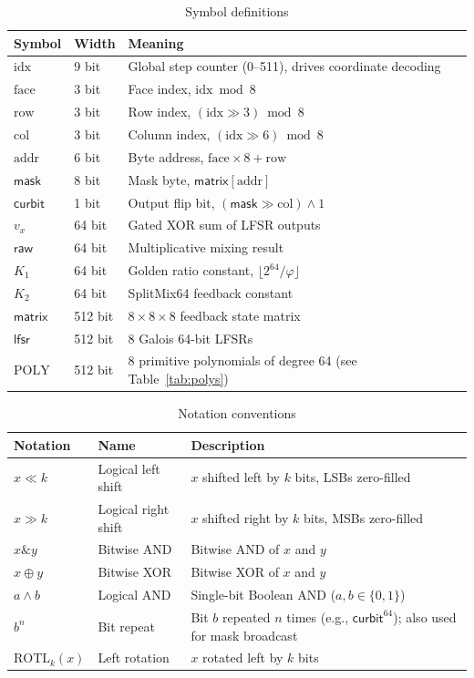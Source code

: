 \documentclass[11pt,a4paper]{article}
\begin{document}
\begin{table}[H]
\centering
\begin{tabular}{@{}llp{5cm}@{}}
\toprule
\textbf{Symbol} & \textbf{Width} & \textbf{Meaning} \\
\midrule
$\mathrm{idx}$   & 9 bit  & Global step counter (0--511), drives coordinate decoding \\
$\mathrm{face}$  & 3 bit  & Face index, $\mathrm{idx} \bmod 8$ \\
$\mathrm{row}$   & 3 bit  & Row index, $(\mathrm{idx} \gg 3) \bmod 8$ \\
$\mathrm{col}$   & 3 bit  & Column index, $(\mathrm{idx} \gg 6) \bmod 8$ \\
$\mathrm{addr}$  & 6 bit  & Byte address, $\mathrm{face} \times 8 + \mathrm{row}$ \\
$\mathsf{mask}$  & 8 bit  & Mask byte, $\mathsf{matrix}[\mathrm{addr}]$ \\
$\mathsf{curbit}$ & 1 bit & Output flip bit, $(\mathsf{mask} \gg \mathrm{col}) \land 1$ \\
$v_x$            & 64 bit & Gated XOR sum of LFSR outputs \\
$\mathsf{raw}$   & 64 bit & Multiplicative mixing result \\
$K_1$            & 64 bit & Golden ratio constant, $\lfloor 2^{64}/\varphi \rfloor$ \\
$K_2$            & 64 bit & SplitMix64 feedback constant \\
$\mathsf{matrix}$ & 512 bit & $8{\times}8{\times}8$ feedback state matrix \\
$\mathsf{lfsr}$  & 512 bit & 8 Galois 64-bit LFSRs \\
$\mathrm{POLY}$  & 512 bit & 8 primitive polynomials of degree 64 (see Table~\ref{tab:polys}) \\
\bottomrule
\end{tabular}
\caption{Symbol definitions}
\label{tab:symbols}
\end{table}

\begin{table}[H]
\centering
\begin{tabular}{@{}llp{5cm}@{}}
\toprule
\textbf{Notation} & \textbf{Name} & \textbf{Description} \\
\midrule
$x \ll k$   & Logical left shift  & $x$ shifted left by $k$ bits, LSBs zero-filled \\
$x \gg k$   & Logical right shift & $x$ shifted right by $k$ bits, MSBs zero-filled \\
$x \mathbin{\&} y$ & Bitwise AND  & Bitwise AND of $x$ and $y$ \\
$x \oplus y$ & Bitwise XOR & Bitwise XOR of $x$ and $y$ \\
$a \land b$ & Logical AND   & Single-bit Boolean AND ($a,b\in\{0,1\}$) \\
$b^{n}$     & Bit repeat    & Bit $b$ repeated $n$ times (e.g., $\mathsf{curbit}^{64}$); also used for mask broadcast \\
$\mathrm{ROTL}_k(x)$ & Left rotation & $x$ rotated left by $k$ bits \\
\bottomrule
\end{tabular}
\caption{Notation conventions}
\label{tab:notation}
\end{table}
\end{document}
